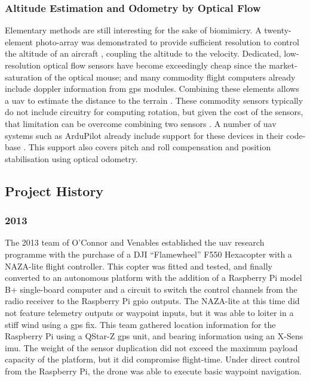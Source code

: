 \documentclass[a4paper, 11pt, titlepage]{article}
\begin{document}
      \subsubsection{Altitude Estimation and Odometry by Optical Flow}
        Elementary methods are still interesting for the sake of biomimicry.  A twenty-element photo-array was demonstrated to provide sufficient resolution to control the altitude of an aircraft \cite{optoAlt}, coupling the altitude to the velocity.
        Dedicated, low-resolution optical flow sensors have become exceedingly cheap since the market-saturation of the optical mouse; and many commodity flight computers already include doppler information from \gls{gps} modules. 
        Combining these elements allows a \gls{uav} to estimate the distance to the terrain \cite{RemTerrain}.  These commodity sensors typically do not include circuitry for computing rotation, but given the cost of the sensors, that limitation can be overcome combining two sensors \cite{FlowRot}.
        A number of \gls{uav} systems such as ArduPilot already include support for these devices in their code-base \cite{ArduFlow}.
        This support also covers pitch and roll compensation and position stabilisation using optical odometry.


    \subsection{Project History}

      \subsubsection{2013}
        The 2013 team of O'Connor \cite{OConnor} and Venables \cite{Venables} established the \gls{uav} research programme with the purchase of a DJI ``Flamewheel'' F550 Hexacopter with a NAZA-lite flight controller.  This copter was fitted and tested, and finally converted to an autonomous platform with the addition of a Raspberry Pi model B+ single-board computer and a circuit to switch the control channels from the radio receiver to the Raspberry Pi \gls{gpio} outputs.
        The NAZA-lite at this time did not feature telemetry outputs or waypoint inputs, but it was able to loiter in a stiff wind using a \gls{gps} fix.
        This team gathered location information for the Raspberry Pi using a QStar-Z \gls{gps} unit, and bearing information using an X-Sens \gls{imu}.  The weight of the sensor duplication did not exceed the maximum payload capacity of the platform, but it did compromise flight-time.
        Under direct control from the Raspberry Pi, the drone was able to execute basic waypoint navigation.
\end{document}
